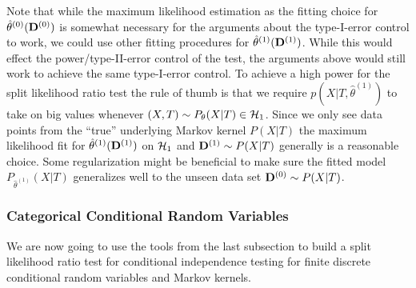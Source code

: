 \begin{Rem}
    Note that while the maximum likelihood estimation as the fitting choice for $\hat \theta^{(0)}(\mathbf{D}^{(0)})$
    is somewhat necessary for the arguments about the type-I-error control to work,
    we could use other fitting procedures for $\hat \theta^{(1)}(\mathbf{D}^{(1)})$. 
    While this would effect the power/type-II-error control of the test, 
    the arguments above would still work to achieve the same type-I-error control.
    To achieve a high power for the split likelihood ratio test the rule of thumb is that we require $p(X|T,\hat \theta^{(1)})$ 
    to take on big values whenever $(X,T) \sim P_\theta(X|T) \in \mathcal{H}_1$.
    Since we only see data points from the ``true'' underlying Markov kernel $P(X|T)$ the maximum likelihood 
    fit for $\hat \theta^{(1)}(\mathbf{D}^{(1)})$ on $\mathcal{H}_1$ and $\mathbf{D}^{(1)} \sim P(X|T)$ generally is a reasonable choice.
    Some regularization might be beneficial to make sure the fitted model $P_{\hat \theta^{(1)}}(X|T)$ generalizes well to 
    the unseen data set $\mathbf{D}^{(0)} \sim P(X|T)$.

\end{Rem}


\subsubsection{Categorical Conditional Random Variables}

We are now going to use the tools from the last subsection to build a split likelihood ratio test for conditional independence testing for finite discrete conditional random variables and Markov kernels.

